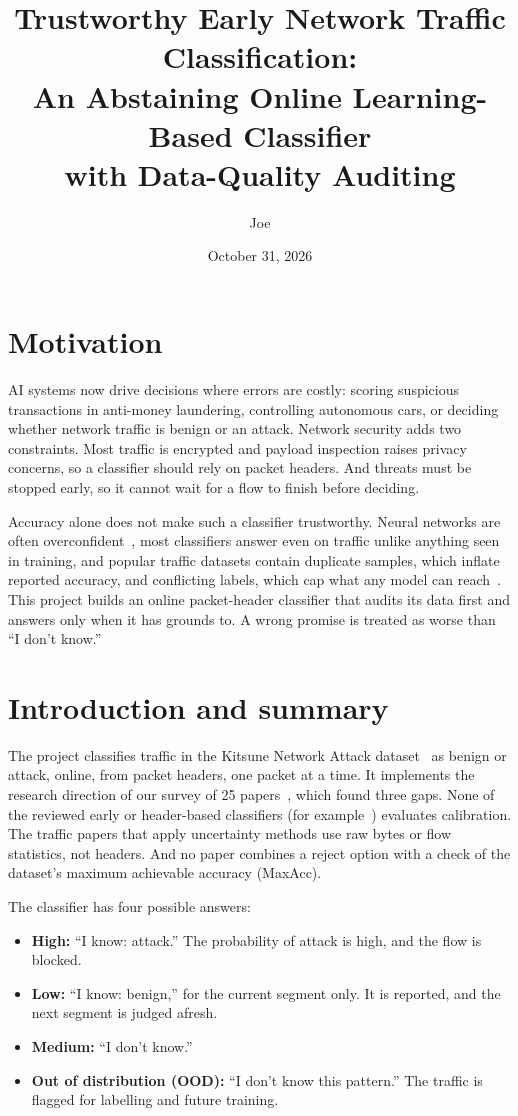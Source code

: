 \documentclass[11pt]{article}
\title{Trustworthy Early Network Traffic Classification:\\ An Abstaining Online Learning-Based Classifier\\ with
Data-Quality Auditing}
\author{Joe}
\date{October 31, 2026}
\begin{document}
\maketitle

\section{Motivation}

AI systems now drive decisions where errors are costly: scoring suspicious transactions in anti-money laundering, controlling autonomous cars, or deciding whether network traffic is benign or an attack. Network security adds two constraints. Most traffic is encrypted and payload inspection raises privacy concerns, so a classifier should rely on packet headers. And threats must be stopped early, so it cannot wait for a flow to finish before deciding.

Accuracy alone does not make such a classifier trustworthy. Neural networks are often overconfident~\cite{guo}, most classifiers answer even on traffic unlike anything seen in training, and popular traffic datasets contain duplicate samples, which inflate reported accuracy, and conflicting labels, which cap what any model can reach~\cite{jerabek}. This project builds an online packet-header classifier that audits its data first and answers only when it has grounds to. A wrong promise is treated as worse than ``I don't know.''

\section{Introduction and summary}

The project classifies traffic in the Kitsune Network Attack dataset~\cite{kitsune} as benign or attack, online, from packet headers, one packet at a time. It implements the research direction of our survey of 25 papers~\cite{survey}, which found three gaps. None of the reviewed early or header-based classifiers (for example~\cite{bernaille,giryes,hu}) evaluates calibration. The traffic papers that apply uncertainty methods use raw bytes or flow statistics, not headers. And no paper combines a reject option with a check of the dataset's maximum achievable accuracy (MaxAcc).

The classifier has four possible answers:

\begin{itemize}
  \item \textbf{High:} ``I know: attack.'' The probability of attack is high, and the flow is blocked.
  \item \textbf{Low:} ``I know: benign,'' for the current segment only. It is reported, and the next segment is judged afresh.
  \item \textbf{Medium:} ``I don't know.''
  \item \textbf{Out of distribution (OOD):} ``I don't know this pattern.'' The traffic is flagged for labelling and future training.
\end{itemize}
\end{document}
